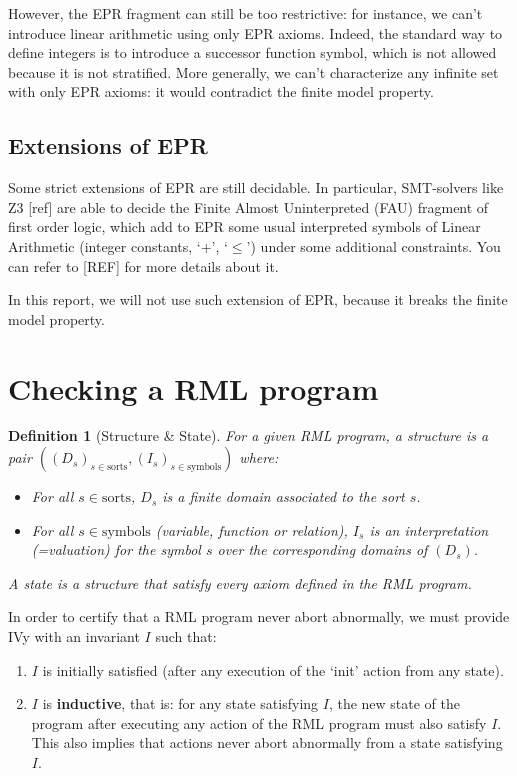 \documentclass[11pt,a4paper,oldfontcommands,openany]{memoir}
\newtheorem*{definition}{Definition}
\begin{document}
        However, the EPR fragment can still be too restrictive: for instance, we can't introduce linear arithmetic using only EPR axioms.
        Indeed, the standard way to define integers is to introduce a successor function symbol, which is not allowed because it is not stratified.
        More generally, we can't characterize any infinite set with only EPR axioms: it would contradict the finite model property.

        \subsection{Extensions of EPR}

        Some strict extensions of EPR are still decidable.
        In particular, SMT-solvers like Z3 [ref] are able to decide the Finite Almost Uninterpreted (FAU) fragment of first order logic,
        which add to EPR some usual interpreted symbols of Linear Arithmetic (integer constants, `+', `\( \leq \)') under some additional constraints.
        You can refer to [REF] for more details about it. 
        
        In this report, we will not use such extension of EPR, because it breaks the finite model property.
    
    \section{Checking a RML program}

    \begin{definition}[Structure \& State]
        For a given RML program, a structure is a pair \(((D_s)_{s\in \text{sorts}}, (I_s)_{s\in \text{symbols}})\) where:
        \begin{itemize}
            \item For all \(s \in \text{sorts}\), \(D_s\) is a finite domain associated to the sort \(s\).
            \item For all \(s \in \text{symbols}\) (variable, function or relation), \(I_s\) is an interpretation (=valuation) for the symbol \(s\) over the corresponding domains of \((D_s)\).
        \end{itemize}
        A state is a structure that satisfy every axiom defined in the RML program.
    \end{definition}

    In order to certify that a RML program never abort abnormally, we must provide IVy with an invariant \(I\) such that:
    \begin{enumerate}
        \item \(I\) is initially satisfied (after any execution of the `init' action from any state).
        \item \(I\) is \textbf{inductive}, that is: for any state satisfying \(I\), the new state of the program after executing any action of the RML program must also satisfy \(I\).
        This also implies that actions never abort abnormally from a state satisfying \(I\).
    \end{enumerate}
\end{document}
